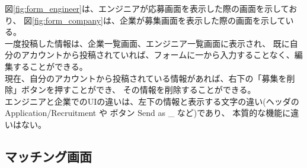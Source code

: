 \documentclass[10pt]{ltjsarticle}
\begin{document}
図\ref{fig:form_engineer}は、エンジニアが応募画面を表示した際の画面を示しており、
図\ref{fig:form_company}は、企業が募集画面を表示した際の画面を示している。\\
\indent 一度投稿した情報は、企業一覧画面、エンジニア一覧画面に表示され、
既に自分のアカウントから投稿されていれば、フォームに一から入力することなく、編集することができる。\\
現在、自分のアカウントから投稿されている情報があれば、右下の「募集を削除」ボタンを押すことができ、
その情報を削除することができる。\\
エンジニアと企業でのUIの違いは、左下の情報と表示する文字の違い(ヘッダのApplication/Recruitment や ボタン Send as \_ など)であり、
本質的な機能に違いはない。

\newpage
\subsection{マッチング画面}
\end{document}
